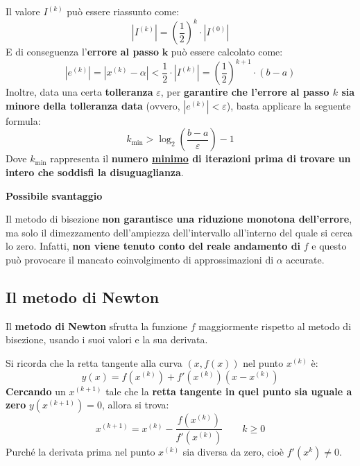 \documentclass[a4paper]{article}
\newcommand{\definition}[1]{\textcolor{Red3}{\textbf{#1}}\index{#1}}
\newcommand{\highspace}{\vspace{1.2em}\noindent}
\begin{document}
    \noindent
    Il valore $I^{(k)}$ può essere riassunto come:
    \begin{equation*}
        \left|I^{(k)}\right| = \left(\dfrac{1}{2}\right)^{k} \cdot \left| I^{(0)} \right|
    \end{equation*}
    E di conseguenza l'\textbf{errore al passo} $\bm{k}$ può essere calcolato come:
    \begin{equation*}
        \left| e^{(k)} \right| = \left| x^{(k)} - \alpha \right| < \dfrac{1}{2} \cdot \left| I^{(k)} \right| = \left(\dfrac{1}{2}\right)^{k+1} \cdot \left(b-a\right)
    \end{equation*}
    Inoltre, data una certa \textbf{tolleranza} $\varepsilon$, per \textbf{garantire che l'errore al passo $k$ sia minore della tolleranza data} (ovvero, $\left| e^{(k)} \right| < \varepsilon$), basta applicare la seguente formula:
    \begin{equation}
        k_{\min} > \log_{2} \left(\dfrac{b-a}{\varepsilon}\right) - 1
    \end{equation}
    Dove $k_{\min}$ rappresenta il \textbf{numero \underline{minimo} di iterazioni prima di trovare un intero che soddisfi la disuguaglianza}.

    \begin{flushleft}
        \textcolor{Red2}{ \textbf{Possibile svantaggio}}
    \end{flushleft}
    Il metodo di bisezione \textbf{non garantisce una riduzione monotona dell'errore}, ma solo il dimezzamento dell'ampiezza dell'intervallo all'interno del quale si cerca lo zero. Infatti, \textbf{non viene tenuto conto del reale andamento di} $f$ e questo può provocare il mancato coinvolgimento di approssimazioni di $\alpha$ accurate.

    \newpage

    \subsection{Il metodo di Newton}

    Il \definition{metodo di Newton} sfrutta la funzione $f$ maggiormente rispetto al metodo di bisezione, usando i suoi valori e la sua derivata.

    \highspace
    Si ricorda che la retta tangente alla curva $\left(x, f\left(x\right)\right)$ nel punto $x^{(k)}$ è:
    \begin{equation*}
        y\left(x\right) = f\left(x^{(k)}\right) + f'\left(x^{(k)}\right)\left(x-x^{(k)}\right)
    \end{equation*}
    \textbf{Cercando} un $x^{\left(k+1\right)}$ tale che la \textbf{retta tangente in quel punto sia uguale a zero} $y\left(x^{\left(k+1\right)}\right) = 0$, allora si trova:
    \begin{equation}\label{eq: metodo di Newton}
        x^{\left(k+1\right)} = x^{\left(k\right)} - \dfrac{f\left(x^{\left(k\right)}\right)}{f'\left(x^{\left(k\right)}\right)} \hspace{2em} k \ge 0
    \end{equation}
    Purché la derivata prima nel punto $x^{(k)}$ sia diversa da zero, cioè $f'\left(x^{k}\right) \ne 0$.
\end{document}
